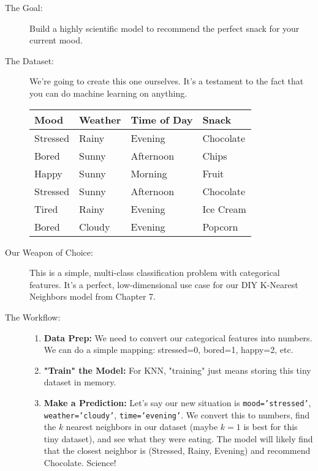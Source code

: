 \documentclass[11pt, letterpaper, openany]{book}
\begin{document}
\begin{description}
    \item[The Goal:] Build a highly scientific model to recommend the perfect snack for your current mood.
    \item[The Dataset:] We're going to create this one ourselves. It's a testament to the fact that you can do machine learning on anything.
    \begin{table}[h!]
    \centering
    \begin{tabular}{llll}
    \hline
    \textbf{Mood} & \textbf{Weather} & \textbf{Time of Day} & \textbf{Snack} \\
    \hline
    Stressed & Rainy & Evening & Chocolate \\
    Bored & Sunny & Afternoon & Chips \\
    Happy & Sunny & Morning & Fruit \\
    Stressed & Sunny & Afternoon & Chocolate \\
    Tired & Rainy & Evening & Ice Cream \\
    Bored & Cloudy & Evening & Popcorn \\
    \hline
    \end{tabular}
    \end{table}
    \item[Our Weapon of Choice:] This is a simple, multi-class classification problem with categorical features. It's a perfect, low-dimensional use case for our DIY K-Nearest Neighbors model from Chapter 7.
    \item[The Workflow:]
    \begin{enumerate}
        \item \textbf{Data Prep:} We need to convert our categorical features into numbers. We can do a simple mapping: stressed=0, bored=1, happy=2, etc.
        \item \textbf{"Train" the Model:} For KNN, "training" just means storing this tiny dataset in memory.
        \item \textbf{Make a Prediction:} Let's say our new situation is \texttt{mood='stressed'}, \texttt{weather='cloudy'}, \texttt{time='evening'}. We convert this to numbers, find the $k$ nearest neighbors in our dataset (maybe $k=1$ is best for this tiny dataset), and see what they were eating. The model will likely find that the closest neighbor is (Stressed, Rainy, Evening) and recommend Chocolate. Science!
    \end{enumerate}
\end{description}
\end{document}
